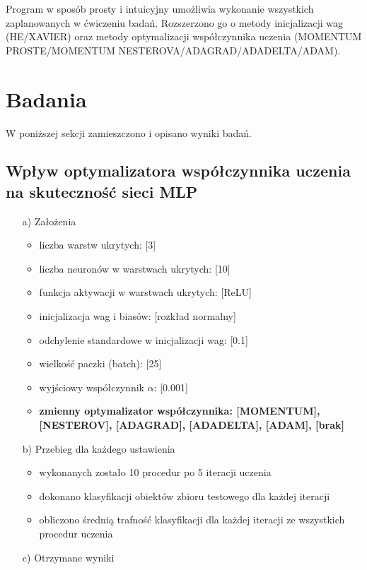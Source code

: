 \documentclass[17pt]{article}
\begin{document}
Program w sposób prosty i intuicyjny umożliwia wykonanie wszystkich zaplanowanych w ćwiczeniu badań. Rozszerzono go o metody inicjalizacji wag (HE/XAVIER) oraz metody optymalizacji współczynnika uczenia (MOMENTUM PROSTE/MOMENTUM NESTEROVA/ADAGRAD/ADADELTA/ADAM).

\section{Badania}
W poniższej sekcji zamieszczono i opisano wyniki badań.
\subsection{Wpływ optymalizatora współczynnika uczenia na skuteczność sieci MLP}
\vspace{4mm}
\begin{enumerate}

\item[a)] Założenia

\begin{itemize}
\item liczba warstw ukrytych: [3]
\item liczba neuronów w warstwach ukrytych: [10]
\item funkcja aktywacji w warstwach ukrytych: [ReLU]
\item inicjalizacja wag i biasów: [rozkład normalny]
\item odchylenie standardowe w inicjalizacji wag: [0.1]
\item wielkość paczki (batch): [25]
\item wyjściowy współczynnik $\alpha$: [0.001]
\item \textbf{zmienny optymalizator współczynnika: 
[MOMENTUM], [NESTEROV], [ADAGRAD], [ADADELTA], [ADAM], [brak]}
\end{itemize}

\item[b)] Przebieg dla każdego ustawienia

\begin{itemize}
\item wykonanych zostało 10 procedur po 5 iteracji uczenia
\item dokonano klasyfikacji obiektów zbioru testowego dla każdej iteracji
\item obliczono średnią trafność klasyfikacji dla każdej iteracji ze wszystkich procedur uczenia
\end{itemize}
\item[c)] Otrzymane wyniki


\end{enumerate}
\end{document}
